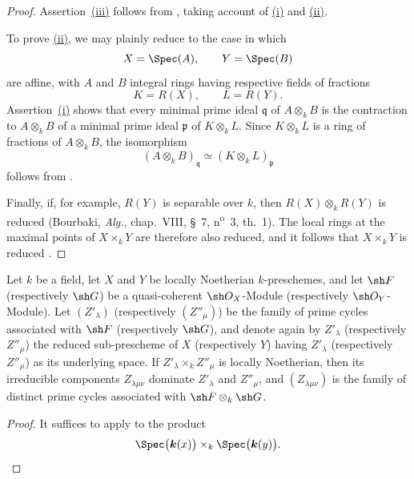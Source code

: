 \begin{proof}
Assertion~{\hyperref[IV.4.2.4.iii]{(iii)}} follows from
, taking account of
{\hyperref[IV.4.2.4.i]{(i)}} and {\hyperref[IV.4.2.4.ii]{(ii)}}.

To prove {\hyperref[IV.4.2.4.ii]{(ii)}}, we may plainly reduce to the case
in which
\[
X=\Spec(A),
\qquad
Y=\Spec(B)
\]
are affine, with $A$ and $B$ integral rings having respective fields of
fractions
\[
K=R(X),
\qquad
L=R(Y).
\]
Assertion~{\hyperref[IV.4.2.4.i]{(i)}} shows that every minimal prime ideal
$\mathfrak q$ of $A\otimes_k B$ is the contraction to $A\otimes_k B$
of a minimal prime ideal $\mathfrak p$ of $K\otimes_k L$.
Since $K\otimes_k L$ is a ring of fractions of $A\otimes_k B$, the
isomorphism
\[
(A\otimes_k B)_{\mathfrak q}
\simeq
(K\otimes_k L)_{\mathfrak p}
\]
follows from .

Finally, if, for example, $R(Y)$ is separable over $k$, then
$R(X)\otimes_kR(Y)$ is reduced
(Bourbaki, \emph{Alg.}, chap.~VIII, \S~7, n\textsuperscript{o}~3, th.~1).
The local rings at the maximal points of $X\times_k Y$ are therefore
also reduced, and it follows that $X\times_k Y$ is reduced
.
\end{proof}

\begin{proposition}[4.2.5]
\label{IV.4.2.5}
Let $k$ be a field, let $X$ and $Y$ be locally Noetherian
$k$-preschemes, and let $\sh F$ \textup{(respectively $\sh G$)} be a
quasi-coherent $\sh O_X$-Module \textup{(respectively} $\sh O_Y$-Module\textup{)}.
Let $(Z'_\lambda)$ \textup{(respectively $(Z''_\mu)$)} be the family of prime
cycles associated with $\sh F$ \textup{(respectively $\sh G$)}, and denote again
by $Z'_\lambda$ \textup{(respectively $Z''_\mu$)} the reduced sub-prescheme of
$X$ \textup{(respectively $Y$)} having $Z'_\lambda$ \textup{(respectively $Z''_\mu$)} as
its underlying space.
If $Z'_\lambda\times_k Z''_\mu$ is locally Noetherian, then its
irreducible components $Z_{\lambda\mu\nu}$ dominate $Z'_\lambda$ and
$Z''_\mu$, and $(Z_{\lambda\mu\nu})$ is the family of distinct prime
cycles associated with $\sh F\otimes_k\sh G$.
\end{proposition}

\begin{proof}
It suffices to apply  to the product
\[
\Spec\bigl(\boldsymbol{k}(x)\bigr)\times_k\Spec\bigl(\boldsymbol{k}(y)\bigr).
\]
\end{proof}

